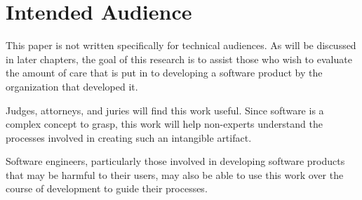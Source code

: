 \section{Intended Audience}

This paper is not written specifically for technical audiences. As will be
discussed in later chapters, the goal of this research is to assist those who
wish to evaluate the amount of care that is put in to developing a software
product by the organization that developed it.

Judges, attorneys, and juries will find this work useful. Since software is a 
complex concept to grasp, this work will help non-experts understand the 
processes involved in creating such an intangible artifact.

Software engineers, particularly those involved in developing software products
that may be harmful to their users, may also be able to use this work over the
course of development to guide their processes.
